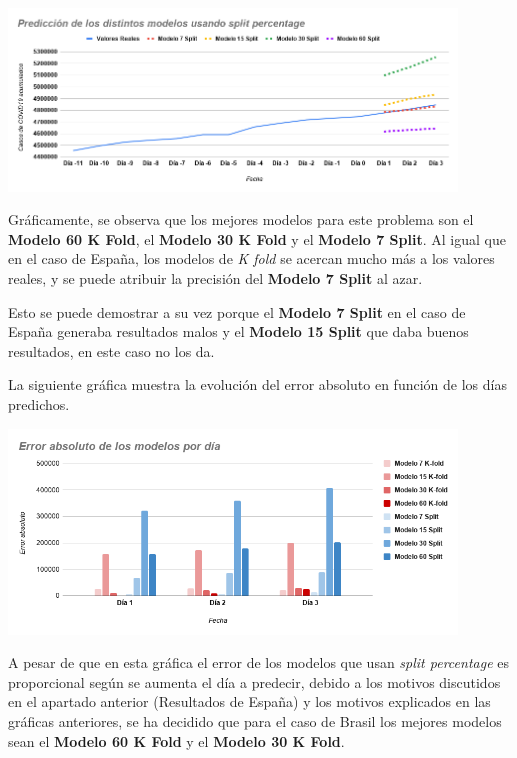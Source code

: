 \documentclass[12pt,a4paper, xcolor=table]{article}
\begin{document}
    \begin{center}
        \includegraphics[width=450px]{img/pred_modelos_split_BZ.png}
    \end{center}

    Gráficamente, se observa que los mejores modelos para este problema son el \textbf{Modelo 60 K Fold}, el \textbf{Modelo 30 K Fold} y el \textbf{Modelo 7 Split}. Al igual que en el caso de España, los modelos de \textit{K fold} se acercan mucho más a los valores reales, y se puede atribuir la precisión del \textbf{Modelo 7 Split} al azar.

    \vspace{2mm}

    Esto se puede demostrar a su vez porque el \textbf{Modelo 7 Split} en el caso de España generaba resultados malos y el \textbf{Modelo 15 Split} que daba buenos resultados, en este caso no los da.

    \vspace{4mm}

    La siguiente gráfica muestra la evolución del error absoluto en función de los días predichos.

    \begin{center}
        \includegraphics[width=450px]{img/error_modelos_BZ.png}
    \end{center}

    A pesar de que en esta gráfica el error de los modelos que usan \textit{split percentage} es proporcional según se aumenta el día a predecir, debido a los motivos discutidos en el apartado anterior (Resultados de España) y los motivos explicados en las gráficas anteriores, se ha decidido que para el caso de Brasil los mejores modelos sean el \textbf{Modelo 60 K Fold} y el \textbf{Modelo 30 K Fold}.
\end{document}
